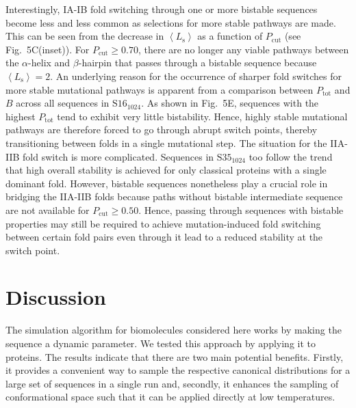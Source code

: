 \documentclass[
aip,
rsi,%
amsmath,amssymb,
reprint,%
]{revtex4-1}
\newcommand {\Pcut}     	{{P_\mathrm{cut}}}
\newcommand {\Ptot}	{{P_\mathrm{tot}}}
\newcommand {\SI}		{${\mathrm{S16}_{1024}}$}
\newcommand {\SII}		{${\mathrm{S35}_{1024}}$}
\begin{document}
Interestingly, IA-IB fold switching through one or more bistable sequences become less and less common as selections for more stable pathways are made. This can be seen from the decrease in $\left <L_\mathrm{s}\right >$ as a function of $\Pcut$ (see Fig.~5C(inset)). For $\Pcut\ge0.70$, there are no longer any viable pathways between the $\alpha$-helix and $\beta$-hairpin that passes through a bistable sequence because $\left <L_\mathrm{s}\right > =  2$. An underlying reason for the occurrence of sharper fold switches for more stable mutational pathways is apparent from a comparison between $\Ptot$ and $B$ across all sequences in {\SI}. As shown in Fig.~5E, sequences with the highest $\Ptot$ tend to exhibit very little bistability. Hence, highly stable mutational pathways are therefore forced to go through abrupt switch points, thereby transitioning between folds in a single mutational step. The situation for the IIA-IIB fold switch is more complicated. Sequences in {\SII} too follow the trend that high overall stability is achieved for only classical proteins with a single dominant fold. However, bistable sequences nonetheless play a crucial role in bridging the IIA-IIB folds because paths without bistable intermediate sequence are not available for $\Pcut\ge0.50$.  Hence, passing through sequences with bistable properties may still be required to achieve mutation-induced fold switching between certain fold pairs even through it lead to a reduced stability at the switch point. 
 

%
%
 
\section{Discussion}
\noindent
The simulation algorithm for biomolecules considered here works by making the sequence a dynamic parameter. We tested this approach by applying it to proteins. The results indicate that there are two main potential benefits. Firstly, it provides a convenient way to sample the respective canonical distributions for a large set of sequences in a single run and, secondly, it enhances the sampling of conformational space such that it can be applied directly at low temperatures. 
\end{document}
